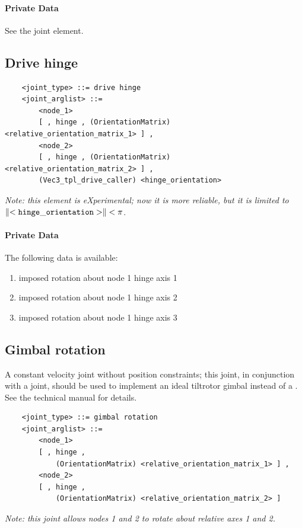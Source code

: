 \paragraph{Private Data}
See the  joint element.



\subsection{Drive hinge}
\begin{verbatim}
    <joint_type> ::= drive hinge
    <joint_arglist> ::= 
        <node_1>
        [ , hinge , (OrientationMatrix) <relative_orientation_matrix_1> ] ,
        <node_2> 
        [ , hinge , (OrientationMatrix) <relative_orientation_matrix_2> ] ,
        (Vec3_tpl_drive_caller) <hinge_orientation>
\end{verbatim}
\emph{Note: this element is eXperimental; now it is more reliable, 
but it is limited to $\left\| \tt <hinge\_orientation> \right\| < \pi$}.

\paragraph{Private Data}
The following data is available:
\begin{enumerate}
\item {} imposed rotation about node 1 hinge axis 1
\item {} imposed rotation about node 1 hinge axis 2
\item {} imposed rotation about node 1 hinge axis 3
\end{enumerate}

\subsection{Gimbal rotation}
A constant velocity joint without position constraints;
this joint, in conjunction with a  joint, 
should be used to implement an ideal tiltrotor gimbal
instead of a .
See the technical manual for details.
\begin{verbatim}
    <joint_type> ::= gimbal rotation
    <joint_arglist> ::= 
        <node_1>
        [ , hinge , 
            (OrientationMatrix) <relative_orientation_matrix_1> ] ,
        <node_2>
        [ , hinge , 
            (OrientationMatrix) <relative_orientation_matrix_2> ]
\end{verbatim}
{\em
    Note: this joint allows nodes 1 and 2 to rotate about relative 
    axes 1 and 2.
}

